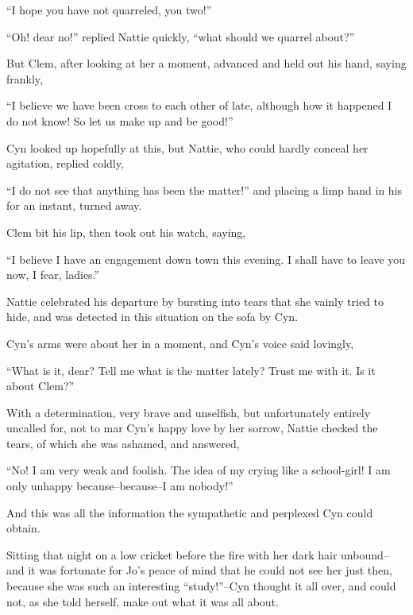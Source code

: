 ``I hope you have not quarreled, you two!''

``Oh! dear no!'' replied Nattie quickly, ``what should we quarrel about?''

But Clem, after looking at her a moment, advanced and held out his hand,
saying frankly,

``I believe we have been cross to each other of late, although how it
happened I do not know! So let us make up and be good!''

Cyn looked up hopefully at this, but Nattie, who could hardly conceal
her agitation, replied coldly,

``I do not see that anything has been the matter!'' and placing a limp
hand in his for an instant, turned away.

Clem bit his lip, then took out his watch, saying,

``I believe I have an engagement down town this evening. I shall have to
leave you now, I fear, ladies.''

Nattie celebrated his departure by bursting into tears that she vainly
tried to hide, and was detected in this situation on the sofa by Cyn.

Cyn's arms were about her in a moment, and Cyn's voice said lovingly,

``What is it, dear? Tell me what is the matter lately? Trust me with it.
Is it about Clem?''

With a determination, very brave and unselfish, but unfortunately
entirely uncalled for, not to mar Cyn's happy love by her sorrow, Nattie
checked the tears, of which she was ashamed, and answered,

``No! I am very weak and foolish. The idea of my crying like a
school-girl! I am only unhappy because--because--I am nobody!''

And this was all the information the sympathetic and perplexed Cyn could
obtain.

Sitting that night on a low cricket before the fire with her dark hair
unbound--and it was fortunate for Jo's peace of mind that he could not
see her just then, because she was such an interesting ``study!''--Cyn
thought it all over, and could not, as she told herself, make out what
it was all about.


